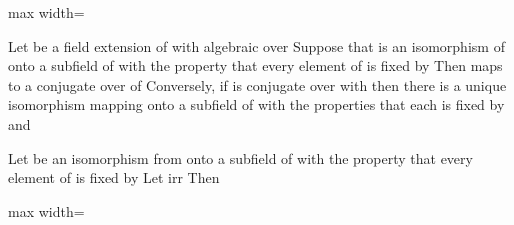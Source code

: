 \documentclass[11pt,oneside]{article}
\begin{document}
\begin{BookBody}
\begin{center}\begin{adjustbox}{max width=\linewidth}\end{adjustbox}\end{center} \BookEnd{\blacklozenge}

 Let  be a field extension of  with  algebraic over  Suppose that \BookInline{\psi } is an isomorphism of  onto a subfield of  with the property that every element of  is fixed by  Then \BookInline{\psi } maps \BookInline{\alpha } to a conjugate over  of  Conversely, if  is conjugate over  with \BookInline{\alpha,\allowbreak } then there is a unique isomorphism \BookInline{\psi _{\alpha,\allowbreak \beta }} mapping  onto a subfield of  with the properties that each  is fixed by \BookInline{\sigma } and 

 Let \BookInline{\psi } be an isomorphism from  onto a subfield of  with the property that every element of  is fixed by  Let irr Then

\begin{center}\begin{adjustbox}{max width=\linewidth}\end{adjustbox}\end{center}


\end{BookBody}
\end{document}
